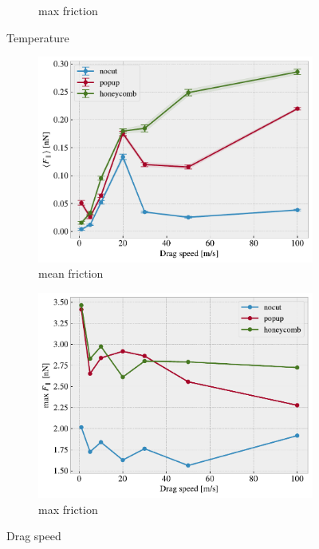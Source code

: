 \begin{figure}[H]
\begin{subfigure}[b]{0.49\textwidth}
      \caption{max friction}
      \label{fig:var_temp_max}
  \end{subfigure}
  \hfill
     \caption{Temperature}
     \label{fig:var_temp}
\end{figure}

\begin{figure}[H]
  \centering
  \begin{subfigure}[b]{0.49\textwidth}
      \centering
      \includegraphics[width=\textwidth]{figures/baseline/variables_vel_mean.pdf}
      \caption{mean friction}
      \label{fig:var_vel_mean}
  \end{subfigure}
  \hfill
  \begin{subfigure}[b]{0.49\textwidth}
      \centering
      \includegraphics[width=\textwidth]{figures/baseline/variables_vel_max.pdf}
      \caption{max friction}
      \label{fig:var_vel_max}
  \end{subfigure}
  \hfill
     \caption{Drag speed}
     \label{fig:var_vel}
\end{figure}

